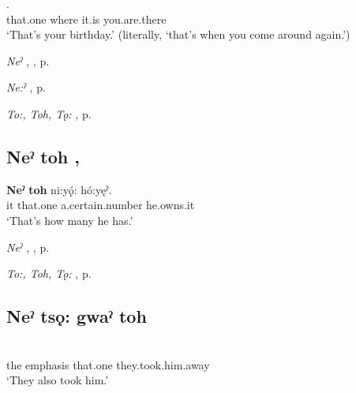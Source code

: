 \ea
\label{ex:npar25}
.\\
that.one where it.is you.are.there\\
\glt ‘That’s your birthday.’ (literally, `that’s when you come around again.’)
\z

\begin{CayugaRelated}
\item \textit{Neˀ} , , p. \pageref{p:[neˀ]}\\
\item \textit{Ne:ˀ} , p. \pageref{p:[ne:ˀ] `it is’}\\
\item \textit{To:, Toh, Tǫ:} , p. \pageref{p:[to:] ‘that one’}
\end{CayugaRelated}

\subsection*{\textbf{Neˀ toh} , } \label{p:[neˀ toh]}

\ea
\label{ex:npar22}
\gll \textbf{Neˀ} \textbf{toh} ni:yǫ́: hó:yęˀ.\\
it that.one a.certain.number he.owns.it\\
\glt ‘That’s how many he has.’
\z

\begin{CayugaRelated}
\item \textit{Neˀ} , , p. \pageref{p:[neˀ]}\\
\item \textit{To:, Toh, Tǫ:} , p. \pageref{p:[to:] ‘that one’}
\end{CayugaRelated}

\subsection*{\textbf{Neˀ tsǫ: gwaˀ toh} } \label{p:[neˀ tsǫ: gwaˀ toh]}

\ea
\label{ex:npar34}
\\
the emphasis that.one they.took.him.away\\
\glt ‘They also took him.’
\z

